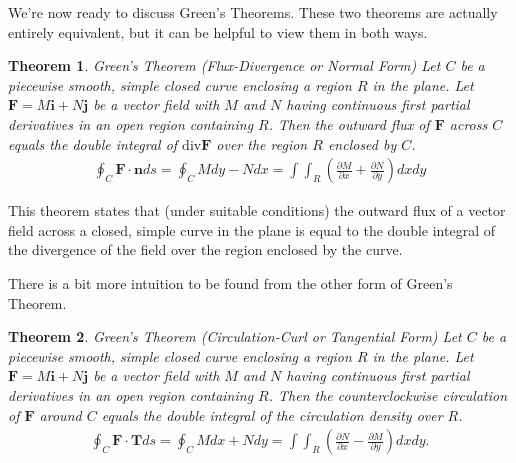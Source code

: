 \documentclass[12pt, letter]{article}
\theoremstyle{plain}
\newtheorem{theorem}{Theorem}
\numberwithin{theorem}{section}
\theoremstyle{definition}
\begin{document}
\bigskip

\hrulefill

\bigskip

We're now ready to discuss Green's Theorems. These two theorems are actually entirely equivalent, but it can be helpful to view them in both ways.

\bigskip

\begin{theorem}{Green's Theorem (Flux-Divergence or Normal Form)}
Let $C$ be a piecewise smooth, simple closed curve enclosing a region $R$ in the plane. Let $\bm{F}=M\bm{i}+N\bm{j}$ be a vector field with $M$ and $N$ having continuous first partial derivatives in an open region containing $R$. Then the outward flux of $\bm{F}$ across $C$ equals the double integral of $\text{div}\bm{F}$ over the region $R$ enclosed by $C$.
\begin{align*}
\oint_C \bm{F}\cdot\bm{n}ds = \oint_C Mdy-Ndx = \int\int_R \left(\frac{\partial M}{\partial x} + \frac{\partial N}{\partial y}\right) dxdy
\end{align*}
\end{theorem}

\bigskip

This theorem states that (under suitable conditions) the outward flux of a vector field across a closed, simple curve in the plane is equal to the double integral of the divergence of the field over the region enclosed by the curve.

\bigskip

\hrulefill

\bigskip

There is a bit more intuition to be found from the other form of Green's Theorem.

\bigskip

\begin{theorem}{Green's Theorem (Circulation-Curl or Tangential Form)}
Let $C$ be a piecewise smooth, simple closed curve enclosing a region $R$ in the plane. Let $\bm{F}=M\bm{i}+N\bm{j}$ be a vector field with $M$ and $N$ having continuous first partial derivatives in an open region containing $R$. Then the counterclockwise circulation of $\bm{F}$ around $C$ equals the double integral of the circulation density over $R$.
\begin{align*}
\oint_C \bm{F}\cdot\bm{T} ds = \oint_C Mdx+Ndy = \int \int_R \left(\frac{\partial N}{\partial x}-\frac{\partial M}{\partial y}\right)dxdy.
\end{align*}
\end{theorem}
\end{document}
